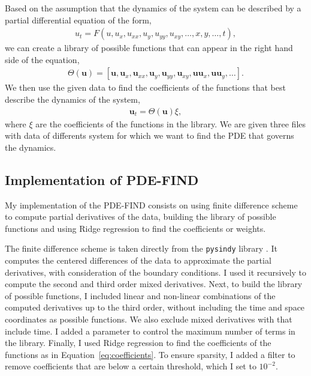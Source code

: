 \documentclass[unicode,11pt,a4paper,oneside,numbers=endperiod,openany]{scrartcl}
\begin{document}
Based on the assumption that the dynamics of the system can be described
by a partial differential equation of the form,
\begin{align}\label{eq:pde}
    u_t = F(u, u_x, u_{xx}, u_y, u_{yy}, u_{xy}, \ldots, x, y, \ldots, t),
\end{align}
we can create a library of possible functions that can appear in the right
hand side of the equation,
\begin{align}\label{eq:library}
    \Theta(\mathbf{u}) = [ \mathbf{u}, \mathbf{u}_x, \mathbf{u}_{xx}, \mathbf{u}_y, \mathbf{u}_{yy}, \mathbf{u}_{xy}, \mathbf{u}\mathbf{u}_x, \mathbf{u}\mathbf{u}_y, \ldots ].
\end{align}
We then use the given data to find the coefficients of the
functions that best describe the dynamics of the system,
\begin{align}\label{eq:coefficients}
    \mathbf{u}_t = \Theta(\mathbf{u})\xi,
\end{align}
where $\xi$ are the coefficients of the functions in the library.
We are given three files with data of differents system for which we want to
find the PDE that governs the dynamics.

\subsection*{Implementation of PDE-FIND}
My implementation of the PDE-FIND consists on using finite difference scheme to
compute partial derivatives of the data, building the library of possible functions
and using Ridge regression to find the coefficients or weights.

The finite difference scheme is taken directly from the \texttt{pysindy} library
\cite{PDEFIND}. It computes the centered differences of the data to approximate
the partial derivatives, with consideration of the boundary conditions.
I used it recursively to compute the second and third order
mixed derivatives. 
Next, to build the library of possible functions, I included linear and non-linear
combinations of the computed derivatives up to the third order, without including
the time and space coordinates as possible functions. We also exclude mixed
derivatives with that include time. I added a parameter to control the maximum
number of terms in the library.
Finally, I used Ridge regression to find the coefficients of the functions as in
Equation~\eqref{eq:coefficients}. To ensure sparsity, I added a filter to remove
coefficients that are below a certain threshold, which I set to $10^{-2}$.
\end{document}
